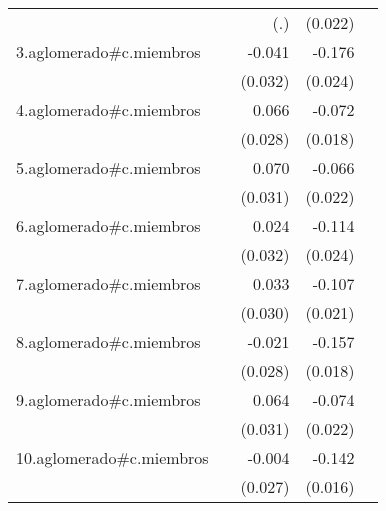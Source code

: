 {\begin{longtable}{l*{4}{D{.}{.}{-1}}}
            &                     &         (.)         &     (0.022)         &                     \\
\addlinespace
3.aglomerado#c.miembros&                     &      -0.041         &      -0.176\sym{***}&                     \\
            &                     &     (0.032)         &     (0.024)         &                     \\
\addlinespace
4.aglomerado#c.miembros&                     &       0.066\sym{*}  &      -0.072\sym{***}&                     \\
            &                     &     (0.028)         &     (0.018)         &                     \\
\addlinespace
5.aglomerado#c.miembros&                     &       0.070\sym{*}  &      -0.066\sym{**} &                     \\
            &                     &     (0.031)         &     (0.022)         &                     \\
\addlinespace
6.aglomerado#c.miembros&                     &       0.024         &      -0.114\sym{***}&                     \\
            &                     &     (0.032)         &     (0.024)         &                     \\
\addlinespace
7.aglomerado#c.miembros&                     &       0.033         &      -0.107\sym{***}&                     \\
            &                     &     (0.030)         &     (0.021)         &                     \\
\addlinespace
8.aglomerado#c.miembros&                     &      -0.021         &      -0.157\sym{***}&                     \\
            &                     &     (0.028)         &     (0.018)         &                     \\
\addlinespace
9.aglomerado#c.miembros&                     &       0.064\sym{*}  &      -0.074\sym{***}&                     \\
            &                     &     (0.031)         &     (0.022)         &                     \\
\addlinespace
10.aglomerado#c.miembros&                     &      -0.004         &      -0.142\sym{***}&                     \\
            &                     &     (0.027)         &     (0.016)         &                     \\

\end{longtable}}
